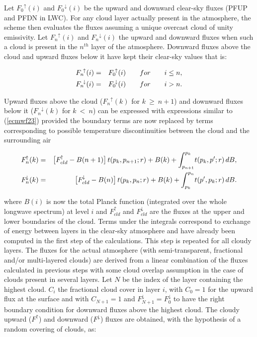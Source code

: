 Let $F_0{^{\!\uparrow}}(i)$ and $F_0{^{\!\downarrow}}(i)$ be the upward and downward clear-sky fluxes (PFUP and PFDN in LWC). For any cloud layer actually present in the atmosphere, the scheme then evaluates the fluxes assuming a unique overcast cloud of unity emissivity. Let $F_n{^{\!\uparrow}}(i)$ and $F_n{^{\!\downarrow}}(i)$ the upward and downward fluxes when such a cloud is present in the $n^{th}$ layer of the atmosphere. Downward fluxes above the cloud and upward fluxes below it have kept their clear-sky values that is:

\medskip
\begin{eqnarray}\label{ecmwf29}
F_n{^{\!\uparrow}}(i) &=& F_0{^{\!\uparrow}}(i) \qquad for \qquad i \leq n, \cr
F_n{^{\!\downarrow}}(i) &=& F_0{^{\!\downarrow}}(i) \qquad for \qquad i > n.
\end{eqnarray}
\medskip

Upward fluxes above the cloud ($F_n{^{\!\uparrow}}(k)$ for $k~\geq~n+1$) and downward fluxes below it ($F_n{^{\!\downarrow}}(k)$ for $k~<~n$) can be expressed with expressions similar to (\ref{ecmwf23}) provided the boundary terms are now replaced by terms corresponding to possible temperature discontinuities between the cloud and the surrounding air

\medskip
\begin{eqnarray}\label{ecmwf210}
F_{n}^{\!\uparrow}(k) &=& \bigl[F_{cld}^{\!\uparrow} - B(n+1)\bigr] \, t(p_k,p_{n+1};r) + B(k) + \int_{p_{n+1}}^{p_k}\!{t(p_k,p';r) \, dB}, \cr
F_{n}^{\!\downarrow}(k) &=& \bigl[F_{cld}^{\!\downarrow} - B(n)\bigr] \, t(p_k,p_n;r) + B(k) + \int_{p_{k}}^{p_n}\!{t(p',p_k;r) \, dB}.
\end{eqnarray}
\medskip

\noindent where $B(i)$ is now the total Planck function (integrated over the whole
longwave spectrum) at level $i$ and $F_{cld}^{\!\uparrow}$ and
$F_{cld}^{\!\downarrow}$ are the fluxes at the upper and lower
boundaries of the cloud.  Terms under the integrals correspond to
exchange of energy between layers in the clear-sky atmosphere and have
already been computed in the first step of the calculations.
This step is repeated for all cloudy layers. The fluxes for the actual atmosphere (with semi-transparent, fractional and/or multi-layered clouds) are derived from a linear combination of the fluxes calculated in previous steps with some cloud overlap assumption in the case of clouds present in several layers. 
Let $N$ be the index of the layer containing the highest cloud.  $C_i$
the fractional cloud cover in layer $i$, with $C_0 = 1$ for the upward
flux at the surface and with $C_{N+1} = 1$ and $F_{N+1}^{\!\downarrow}
= F_0^{\!\downarrow}$ to have the right boundary condition for downward
fluxes above the highest cloud.  The cloudy upward ($F^{\!\uparrow}$)
and downward ($F^{\!\downarrow}$) fluxes are obtained, with the hypothesis
of a random covering of clouds, as:

